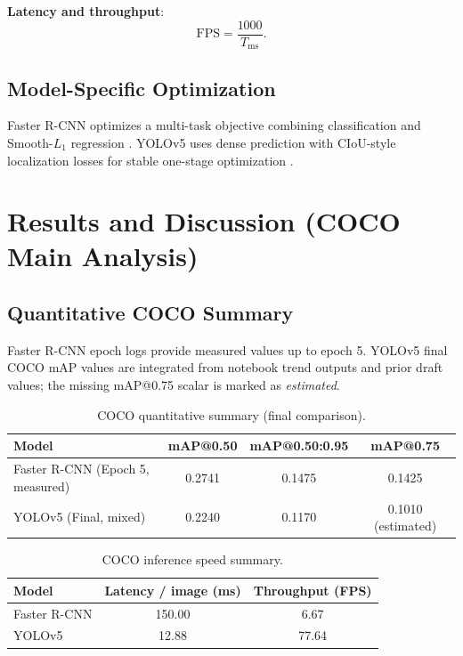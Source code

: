 \documentclass[conference]{IEEEtran}
\begin{document}
\textbf{Latency and throughput}:
\begin{equation}
\mathrm{FPS}=\frac{1000}{T_{\mathrm{ms}}}.
\end{equation}

\subsection{Model-Specific Optimization}
Faster R-CNN optimizes a multi-task objective combining classification and Smooth-$L_1$ regression \cite{ren2015faster}. YOLOv5 uses dense prediction with CIoU-style localization losses for stable one-stage optimization \cite{yolov5}.

\section{Results and Discussion (COCO Main Analysis)}
\subsection{Quantitative COCO Summary}
Faster R-CNN epoch logs provide measured values up to epoch 5. YOLOv5 final COCO mAP values are integrated from notebook trend outputs and prior draft values; the missing mAP@0.75 scalar is marked as \textit{estimated}.

\begin{table}[H]
\centering
\caption{COCO quantitative summary (final comparison).}
\label{tab:coco-main}
\begin{tabular}{lccc}
\toprule
\textbf{Model} & \textbf{mAP@0.50} & \textbf{mAP@0.50:0.95} & \textbf{mAP@0.75} \\
\midrule
Faster R-CNN (Epoch 5, measured) & 0.2741 & 0.1475 & 0.1425 \\
YOLOv5 (Final, mixed) & 0.2240 & 0.1170 & 0.1010 (estimated) \\
\bottomrule
\end{tabular}
\end{table}

\begin{table}[H]
\centering
\caption{COCO inference speed summary.}
\label{tab:coco-speed}
\begin{tabular}{lcc}
\toprule
\textbf{Model} & \textbf{Latency / image (ms)} & \textbf{Throughput (FPS)} \\
\midrule
Faster R-CNN & 150.00 & 6.67 \\
YOLOv5 & 12.88 & 77.64 \\
\bottomrule
\end{tabular}
\end{table}
\end{document}

